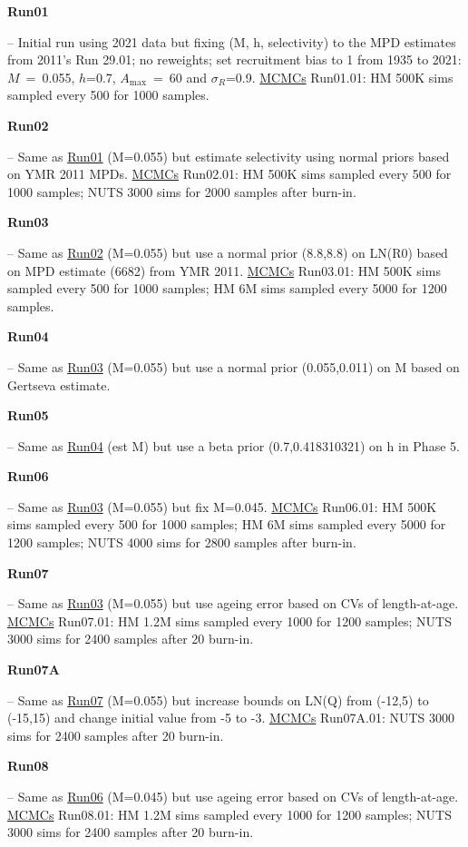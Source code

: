 \hypertarget{R01}{\textbf{Run01}} -- Initial run using 2021 data but fixing (M, h, selectivity) to the MPD estimates from 2011's Run 29.01; no reweights; set recruitment bias to 1 from 1935 to 2021: $M$~=~0.055, $h$=0.7, $A_\mathrm{max}$~=~60 and $\sigma_R$=0.9. \underline{MCMCs} Run01.01: HM 500K sims sampled every 500 for 1000 samples.

\hypertarget{R02}{\textbf{Run02}} -- Same as \hyperlink{R01}{Run01} (M=0.055) but estimate selectivity using normal priors based on YMR 2011 MPDs. \underline{MCMCs} Run02.01: HM 500K sims sampled every 500 for 1000 samples; NUTS 3000 sims for 2000 samples after burn-in.

\hypertarget{R03}{\textbf{Run03}} -- Same as \hyperlink{R02}{Run02} (M=0.055) but use a normal prior (8.8,8.8) on LN(R0) based on MPD estimate (6682) from YMR 2011. \underline{MCMCs} Run03.01: HM 500K sims sampled every 500 for 1000 samples; HM 6M sims sampled every 5000 for 1200 samples.

\hypertarget{R04}{\textbf{Run04}} -- Same as \hyperlink{R03}{Run03} (M=0.055) but use a normal prior (0.055,0.011) on M based on Gertseva estimate.

\hypertarget{R05}{\textbf{Run05}} -- Same as \hyperlink{R04}{Run04} (est M) but use a beta prior (0.7,0.418310321) on h in Phase 5.

\hypertarget{R06}{\textbf{Run06}} -- Same as \hyperlink{R03}{Run03} (M=0.055) but fix M=0.045. \underline{MCMCs} Run06.01: HM 500K sims sampled every 500 for 1000 samples; HM 6M sims sampled every 5000 for 1200 samples; NUTS 4000 sims for 2800 samples after burn-in.

\hypertarget{R07}{\textbf{Run07}} -- Same as \hyperlink{R03}{Run03} (M=0.055) but use ageing error based on CVs of length-at-age. \underline{MCMCs} Run07.01: HM 1.2M sims sampled every 1000 for 1200 samples; NUTS 3000 sims for 2400 samples after 20\pc{} burn-in.

\hypertarget{R07A}{\textbf{Run07A}} -- Same as \hyperlink{R07}{Run07} (M=0.055) but increase bounds on LN(Q) from (-12,5) to (-15,15) and change initial value from -5 to -3. \underline{MCMCs} Run07A.01: NUTS 3000 sims for 2400 samples after 20\pc{} burn-in.

\hypertarget{R08}{\textbf{Run08}} -- Same as \hyperlink{R06}{Run06} (M=0.045) but use ageing error based on CVs of length-at-age. \underline{MCMCs} Run08.01: HM 1.2M sims sampled every 1000 for 1200 samples; NUTS 3000 sims for 2400 samples after 20\pc{} burn-in.

